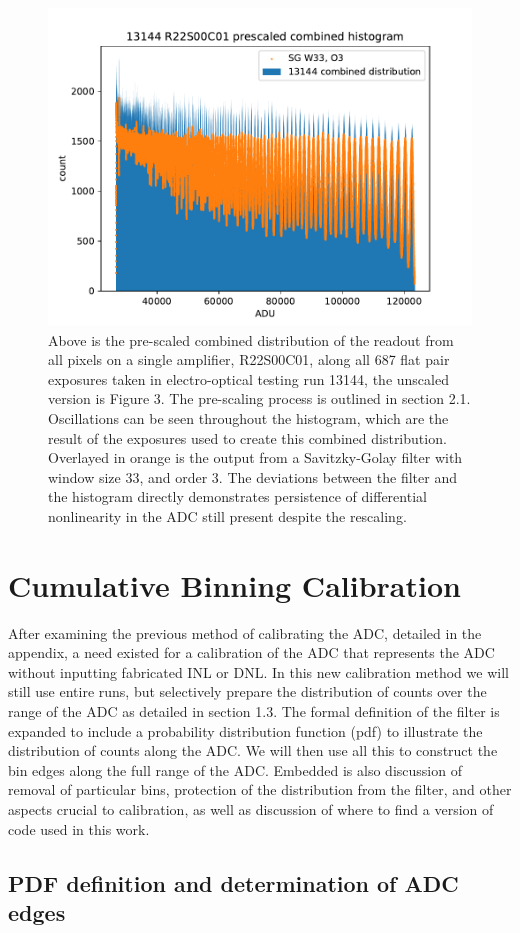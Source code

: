 \documentclass[11pt, letterpaper]{article}
\begin{document}
\begin{figure}
    \centering
    \includegraphics[width=0.5\linewidth]{bar13144.pdf}
    \caption{Above is the pre-scaled combined distribution of the readout from all pixels on a single amplifier, R22S00C01, along all 687 flat pair exposures taken in electro-optical testing run 13144, the unscaled version is Figure 3. The pre-scaling process is outlined in section 2.1. Oscillations can be seen throughout the histogram, which are the result of the exposures used to create this combined distribution. Overlayed in orange is the output from a Savitzky-Golay filter with window size 33, and order 3. The deviations between the filter and the histogram directly demonstrates persistence of differential nonlinearity in the ADC still present despite the rescaling.}
\end{figure}

\section{Cumulative Binning Calibration}
\indent


After examining the previous method of calibrating the ADC, detailed in the appendix, a need existed for a calibration of the ADC that represents the ADC without inputting fabricated INL or DNL. 
In this new calibration method we will still use entire runs, but selectively prepare the distribution of counts over the range of the ADC as detailed in section 1.3. 
The formal definition of the filter is expanded to include a probability distribution function (pdf) to illustrate the distribution of counts along the ADC. 
We will then use all this to construct the bin edges along the full range of the ADC. 
Embedded is also discussion of removal of particular bins, protection of the distribution from the filter, and other aspects crucial to calibration, as well as discussion of where to find a version of code used in this work.



\subsection{PDF definition and determination of ADC edges} 	
\indent
\end{document}

